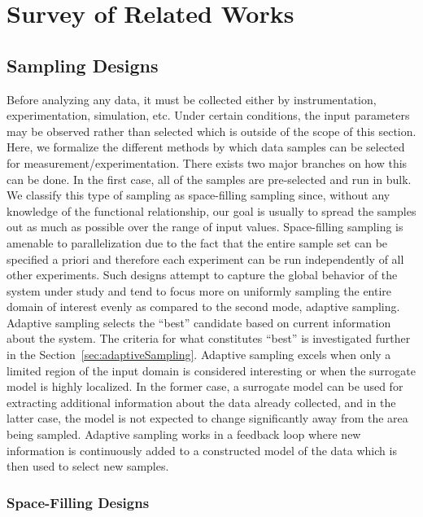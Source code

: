 
\chapter{Survey of Related Works}
\label{ch:related}
\section{Sampling Designs}
\label{sec:sampling}

Before analyzing any data, it must be collected either by instrumentation, experimentation, simulation, etc.
%
Under certain conditions, the input parameters may be observed rather than selected which is outside of the scope of this section.
%
Here, we formalize the different methods by which data samples can be selected for measurement/experimentation.
%
There exists two major branches on how this can be done.
%
In the first case, all of the samples are pre-selected and run in bulk.
%
We classify this type of sampling as space-filling sampling since, without any knowledge of the functional relationship, our goal is usually to spread the samples out as much as possible over the range of input values.
%
Space-filling sampling is amenable to parallelization due to the fact that the entire sample set can be specified a priori and therefore each experiment can be run independently of all other experiments.
%
Such designs attempt to capture the global behavior of the system under study and tend to focus more on uniformly sampling the entire domain of interest evenly as compared to the second mode, adaptive sampling.
%
Adaptive sampling selects the ``best'' candidate based on current information about the system.
%
The criteria for what constitutes ``best'' is investigated further in the Section~\ref{sec:adaptiveSampling}.
%
Adaptive sampling excels when only a limited region of the input domain is considered interesting or when the surrogate model is highly localized. 
%
In the former case, a surrogate model can be used for extracting additional information about the data already collected, and in the latter case, the model is not expected to change significantly away from the area being sampled.
%
Adaptive sampling works in a feedback loop where new information is continuously added to a constructed model of the data which is then used to select new samples.

\subsection{Space-Filling Designs}
\label{sec:forwardSampling}

